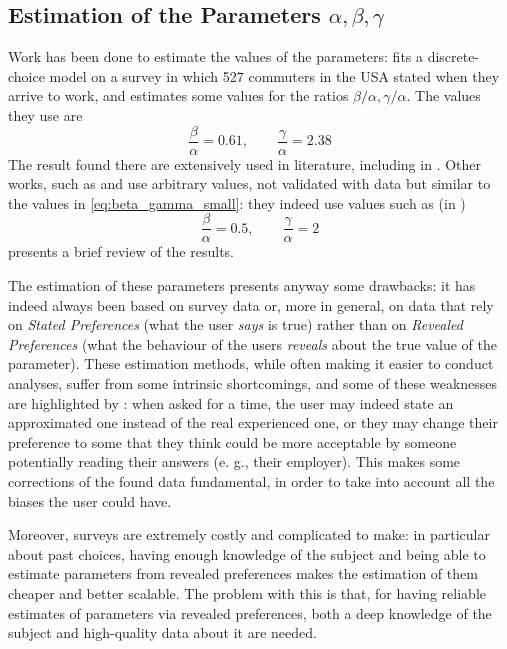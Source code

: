 \subsection{Estimation of the Parameters $\alpha, \beta, \gamma$}

Work has been done to estimate the values of the parameters:
\textcite{54d203ee-4bf8-3234-9286-56e4c8b7f5bd} fits a discrete-choice model on a survey in which 527 commuters in the USA stated when they arrive to work, and estimates some values for the ratios \(\beta/\alpha, \gamma/\alpha\).
The values they use are
\begin{equation}
  \label{eq:beta_gamma_small}
  \frac{\beta}{\alpha} = 0.61,\qquad \frac{\gamma}{\alpha} = 2.38
\end{equation}
The result found there are extensively used in literature, including in \textcite{d0907f84-e14a-3d98-ad20-759f41491d6e}.
Other works, such as \textcite{doi:10.3141/1807-04} and \textcite{4ffb5da1-1f49-3898-98a7-209781744dc0} use arbitrary values,
not validated with data but similar to the values in \eqref{eq:beta_gamma_small}:
they indeed use values such as (in \cite{4ffb5da1-1f49-3898-98a7-209781744dc0})
\begin{equation}
  \label{eq:beta_gamma_vickrey}
  \frac{\beta}{\alpha} = 0.5,\qquad \frac{\gamma}{\alpha} = 2
\end{equation}
\textcite{https://doi.org/10.1111/iere.12692} presents a brief review of the results.

The estimation of these parameters presents anyway some drawbacks:
it has indeed always been based on survey data or,
more in general, on data that rely on \textit{Stated Preferences} (what the user \textit{says} is true)
rather than on \textit{Revealed Preferences} (what the behaviour of the users \textit{reveals} about the true value of the parameter).
These estimation methods, while often making it easier to conduct analyses,
suffer from some intrinsic shortcomings,
and some of these weaknesses are highlighted by \textcite{54d203ee-4bf8-3234-9286-56e4c8b7f5bd}:
when asked for a time, the user may indeed state an approximated one instead of the real experienced one,
or they may change their preference to some that they think could be more acceptable by someone potentially reading their answers (e. g., their employer).
This makes some corrections of the found data fundamental,
in order to take into account all the biases the user could have.

Moreover, surveys are extremely costly and complicated to make:
in particular about past choices, having enough knowledge of the subject
and being able to estimate parameters from revealed preferences
makes the estimation of them cheaper and better scalable.
The problem with this is that,
for having reliable estimates of parameters via revealed preferences,
both a deep knowledge of the subject and high-quality data about it are needed.

